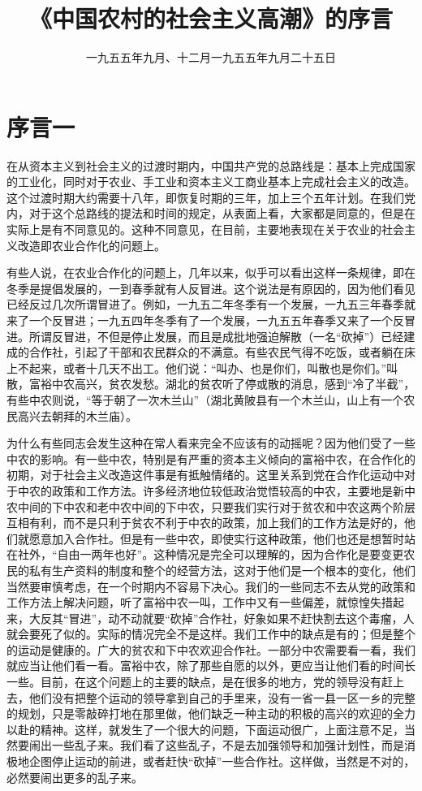 
\title{《中国农村的社会主义高潮》的序言}
\date{一九五五年九月、十二月}
\maketitle


\date{一九五五年九月二十五日}
\section{序言一}

在从资本主义到社会主义的过渡时期内，中国共产党的总路线是：基本上完成国家的工业化，同时对于农业、手工业和资本主义工商业基本上完成社会主义的改造。这个过渡时期大约需要十八年，即恢复时期的三年，加上三个五年计划。在我们党内，对于这个总路线的提法和时间的规定，从表面上看，大家都是同意的，但是在实际上是有不同意见的。这种不同意见，在目前，主要地表现在关于农业的社会主义改造即农业合作化的问题上。

有些人说，在农业合作化的问题上，几年以来，似乎可以看出这样一条规律，即在冬季是提倡发展的，一到春季就有人反冒进。这个说法是有原因的，因为他们看见已经反过几次所谓冒进了。例如，一九五二年冬季有一个发展，一九五三年春季就来了一个反冒进；一九五四年冬季有了一个发展，一九五五年春季又来了一个反冒进。所谓反冒进，不但是停止发展，而且是成批地强迫解散（一名“砍掉”）已经建成的合作社，引起了干部和农民群众的不满意。有些农民气得不吃饭，或者躺在床上不起来，或者十几天不出工。他们说：“叫办、也是你们，叫散也是你们。”叫散，富裕中农高兴，贫农发愁。湖北的贫农听了停或散的消息，感到“冷了半截”，有些中农则说，“等于朝了一次木兰山”（湖北黄陂县有一个木兰山，山上有一个农民高兴去朝拜的木兰庙）。

为什么有些同志会发生这种在常人看来完全不应该有的动摇呢？因为他们受了一些中农的影响。有一些中农，特别是有严重的资本主义倾向的富裕中农，在合作化的初期，对于社会主义改造这件事是有抵触情绪的。这里关系到党在合作化运动中对于中农的政策和工作方法。许多经济地位较低政治觉悟较高的中农，主要地是新中农中间的下中农和老中农中间的下中农，只要我们实行对于贫农和中农这两个阶层互相有利，而不是只利于贫农不利于中农的政策，加上我们的工作方法是好的，他们就愿意加入合作社。但是有一些中农，即使实行这种政策，他们也还是想暂时站在社外，“自由一两年也好”。这种情况是完全可以理解的，因为合作化是要变更农民的私有生产资料的制度和整个的经营方法，这对于他们是一个根本的变化，他们当然要审慎考虑，在一个时期内不容易下决心。我们的一些同志不去从党的政策和工作方法上解决问题，听了富裕中农一叫，工作中又有一些偏差，就惊惶失措起来，大反其“冒进”，动不动就要“砍掉”合作社，好象如果不赶快割去这个毒瘤，人就会要死了似的。实际的情况完全不是这样。我们工作中的缺点是有的；但是整个的运动是健康的。广大的贫农和下中农欢迎合作社。一部分中农需要看一看，我们就应当让他们看一看。富裕中农，除了那些自愿的以外，更应当让他们看的时间长一些。目前，在这个问题上的主要的缺点，是在很多的地方，党的领导没有赶上去，他们没有把整个运动的领导拿到自己的手里来，没有一省一县一区一乡的完整的规划，只是零敲碎打地在那里做，他们缺乏一种主动的积极的高兴的欢迎的全力以赴的精神。这样，就发生了一个很大的问题，下面运动很广，上面注意不足，当然要闹出一些乱子来。我们看了这些乱子，不是去加强领导和加强计划性，而是消极地企图停止运动的前进，或者赶快“砍掉”一些合作社。这样做，当然是不对的，必然要闹出更多的乱子来。

